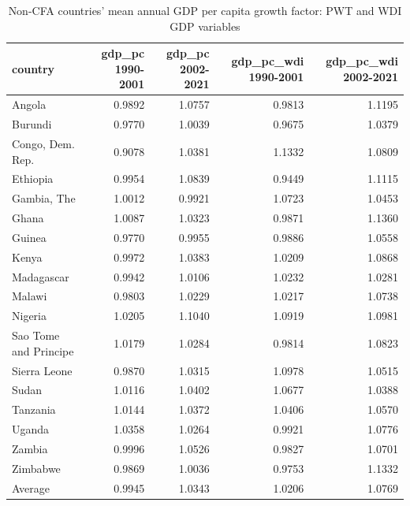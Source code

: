 \begin{table}

\caption{Non-CFA countries' mean annual GDP per capita growth factor: PWT and WDI GDP variables}
\centering
\begin{tabular}[t]{lrrrr}
\toprule
country & gdp\_pc 1990-2001 & gdp\_pc 2002-2021 & gdp\_pc\_wdi 1990-2001 & gdp\_pc\_wdi 2002-2021\\
\midrule
Angola & 0.9892 & 1.0757 & 0.9813 & 1.1195\\
Burundi & 0.9770 & 1.0039 & 0.9675 & 1.0379\\
Congo, Dem. Rep. & 0.9078 & 1.0381 & 1.1332 & 1.0809\\
Ethiopia & 0.9954 & 1.0839 & 0.9449 & 1.1115\\
Gambia, The & 1.0012 & 0.9921 & 1.0723 & 1.0453\\
\addlinespace
Ghana & 1.0087 & 1.0323 & 0.9871 & 1.1360\\
Guinea & 0.9770 & 0.9955 & 0.9886 & 1.0558\\
Kenya & 0.9972 & 1.0383 & 1.0209 & 1.0868\\
Madagascar & 0.9942 & 1.0106 & 1.0232 & 1.0281\\
Malawi & 0.9803 & 1.0229 & 1.0217 & 1.0738\\
\addlinespace
Nigeria & 1.0205 & 1.1040 & 1.0919 & 1.0981\\
Sao Tome and Principe & 1.0179 & 1.0284 & 0.9814 & 1.0823\\
Sierra Leone & 0.9870 & 1.0315 & 1.0978 & 1.0515\\
Sudan & 1.0116 & 1.0402 & 1.0677 & 1.0388\\
Tanzania & 1.0144 & 1.0372 & 1.0406 & 1.0570\\
\addlinespace
Uganda & 1.0358 & 1.0264 & 0.9921 & 1.0776\\
Zambia & 0.9996 & 1.0526 & 0.9827 & 1.0701\\
Zimbabwe & 0.9869 & 1.0036 & 0.9753 & 1.1332\\
Average & 0.9945 & 1.0343 & 1.0206 & 1.0769\\
\bottomrule
\end{tabular}
\end{table}